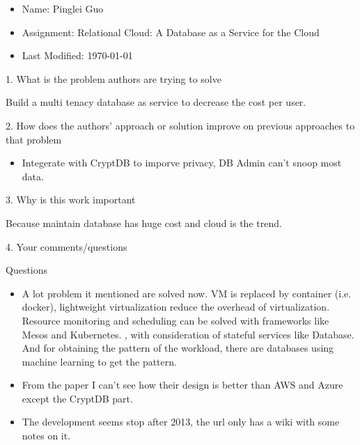 \documentclass[12pt,a4paper,oneside]{article}
\begin{document}
\begin{itemize}
  \item Name: Pinglei Guo
  \item Assignment: Relational Cloud: A Database as a Service for the Cloud
  \item Last Modified: \today
\end{itemize}

1. What is the problem authors are trying to solve

\medskip

Build a multi tenacy database as service to decrease the cost per user.

\bigskip

2. How does the authors’ approach or solution improve on previous approaches to that problem

\medskip

\begin{itemize}
  \item Integerate with CryptDB to imporve privacy, DB Admin can't snoop most data.
\end{itemize}

\bigskip

3. Why is this work important

\medskip

Because maintain database has huge cost and cloud is the trend.

\bigskip

4. Your comments/questions

\medskip

Questions

\begin{itemize}
	\item A lot problem it mentioned are solved now. VM is replaced by container (i.e. docker), lightweight virtualization
  reduce the overhead of virtualization. Resource monitoring and scheduling can be solved with frameworks like Mesos and Kubernetes.
  , with consideration of stateful services like Database.
  And for obtaining the pattern of the workload, there are databases using machine learning to get the pattern.
  \item From the paper I can't see how their design is better than AWS and Azure except the CryptDB part.
  \item The development seems stop after 2013, the url only has a wiki with some notes on it.
\end{itemize}
\end{document}
